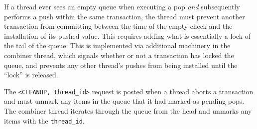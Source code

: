 If a thread ever sees an empty queue when executing a pop \emph{and} subsequently performs a push within the same transaction, the thread must prevent another transaction from committing between the time of the empty check and the installation of its pushed value. This requires adding what is essentially a lock of the tail of the queue. This is implemented via additional machinery in the combiner thread, which signals whether or not a transaction has locked the queue, and prevents any other thread's pushes from being installed until the ``lock'' is released.

The \texttt{<CLEANUP, thread\_id>} request is posted when a thread aborts a transaction and must unmark any items in the queue that it had marked as pending pops. The combiner thread iterates through the queue from the head and unmarks any items with the \texttt{thread\_id}.
